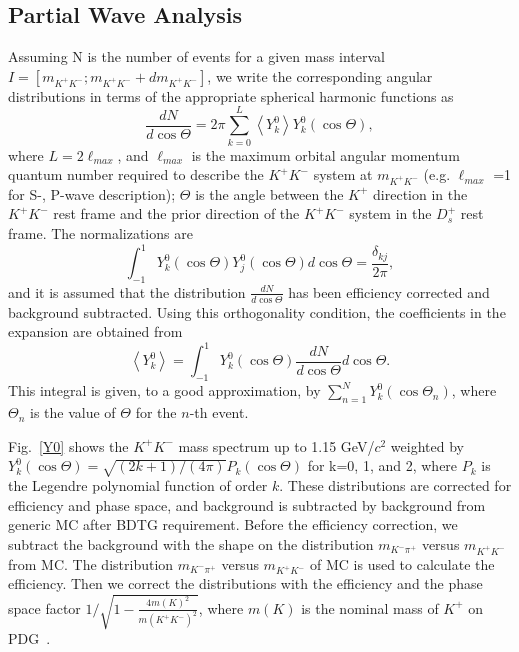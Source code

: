 \subsection{Partial Wave Analysis}
\par{Assuming N is the number of events for a given mass interval $I=[m_{K^{+}K^{-}}; m_{K^{+}K^{-}} + dm_{K^{+}K^{-}}]$, we write the corresponding angular distributions in terms of the appropriate spherical harmonic functions as 
    \begin{equation}
        \frac{dN}{d\cos\Theta} = 2\pi\sum_{k=0}^L\left\langle Y_{k}^{0}\right\rangle Y_{k}^{0}(\cos\Theta),\label{expansion}
    \end{equation}
    where $L = 2 \ell_{max}$, and $\ell_{max}$ is the maximum orbital angular momentum quantum number required to describe the $K^{+}K^{-}$ system at $m_{K^{+}K^{-}}$ (e.g. $\ell_{max}$ =1 for S-, P-wave description); $\Theta$ is the angle between the $K^{+}$ direction in the $K^{+}K^{-}$ rest frame and the prior direction of the $K^{+}K^{-}$ system in the $D_{s}^{+}$ rest frame. 
    The normalizations are 
    \begin{equation}
        \int_{-1}^{1}Y_{k}^{0}(\cos\Theta)Y_{j}^{0}(\cos\Theta) d\cos\Theta  = \frac{\delta_{kj}}{2\pi},\label{sh-normalizations}
    \end{equation}
    and it is  assumed that the distribution $\frac{dN}{d\cos\Theta}$ has been efficiency corrected and background subtracted.
    Using this orthogonality condition, the coefficients in the expansion are obtained from 
    \begin{equation}
        \left\langle Y_{k}^{0} \right\rangle = \int_{-1}^{1}Y_{k}^{0}(\cos\Theta) \frac{dN}{d\cos\Theta} d\cos\Theta. \label{expansion-coefficients}
    \end{equation}
    This integral is given, to a good approximation, by $\sum_{n=1}^{N}Y_{k}^{0}(\cos\Theta_{n})$, where $\Theta_{n}$ is the value of $\Theta$ for the $n$-th event.
    
    Fig.~\ref{Y0} shows the $K^{+}K^{-}$ mass spectrum up to 1.15 GeV/$c^{2}$ weighted by $Y_{k}^{0}(\cos\Theta) = \sqrt{(2k+1)/(4\pi)}P_{k}(\cos\Theta)$ for k=0, 1, and 2, where $P_{k}$ is the Legendre polynomial function of order $k$. 
    These distributions are corrected for efficiency and phase space, and background is subtracted by background from generic MC after BDTG requirement.
    Before the efficiency correction, we subtract the background with the shape on the distribution $m_{K^{-}\pi^{+}}$ versus $m_{K^{+}K^{-}}$ from MC. 
    The distribution $m_{K^{-}\pi^{+}}$ versus $m_{K^{+}K^{-}}$ of MC is used to calculate the efficiency.
    Then we correct the distributions with the efficiency and the phase space factor $1/\sqrt{ 1 - \frac{4m(K)^{2}}{m(K^{+}K^{-})^{2}}}$, where $m(K)$ is the nominal mass of $K^{+}$ on PDG~\cite{PDG2018}.
    
}
